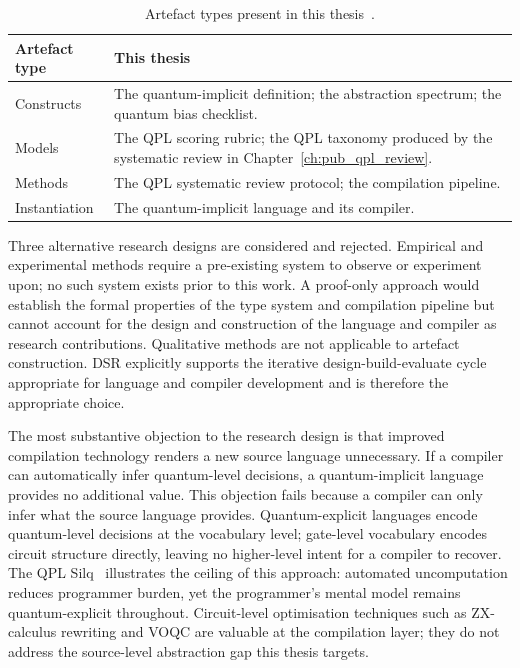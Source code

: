 \begin{table}[h]
    \centering
    \begin{tabular}{lp{}}
        \toprule
        \textbf{Artefact type} & \textbf{This thesis}                                                                                              \\
        \midrule
        Constructs             & The quantum-implicit definition; the abstraction spectrum; the quantum bias checklist.                            \\
        Models                 & The QPL scoring rubric; the QPL taxonomy produced by the systematic review in Chapter~\ref{ch:pub_qpl_review}. \\
        Methods                & The QPL systematic review protocol; the compilation pipeline.                                                     \\
        Instantiation          & The quantum-implicit language and its compiler.                                                                   \\
        \bottomrule
    \end{tabular}
    \caption{Artefact types present in this thesis~\cite{Hevner2004DesignScienceIS}.}
    \label{tab:methodology:artefact-types}
\end{table}

Three alternative research designs are considered and rejected.
Empirical and experimental methods require a pre-existing system to observe or experiment upon; no such system exists prior to this work.
A proof-only approach would establish the formal properties of the type system and compilation pipeline but cannot account for the design and construction of the language and compiler as research contributions.
Qualitative methods are not applicable to artefact construction.
DSR explicitly supports the iterative design-build-evaluate cycle appropriate for language and compiler development and is therefore the appropriate choice.

The most substantive objection to the research design is that improved compilation technology renders a new source language unnecessary.
If a compiler can automatically infer quantum-level decisions, a quantum-implicit language provides no additional value.
This objection fails because a compiler can only infer what the source language provides.
Quantum-explicit languages encode quantum-level decisions at the vocabulary level; gate-level vocabulary encodes circuit structure directly, leaving no higher-level intent for a compiler to recover.
The QPL Silq~\cite{bichsel2020silq} illustrates the ceiling of this approach: automated uncomputation reduces programmer burden, yet the programmer's mental model remains quantum-explicit throughout.
Circuit-level optimisation techniques such as ZX-calculus rewriting and VOQC are valuable at the compilation layer; they do not address the source-level abstraction gap this thesis targets.

